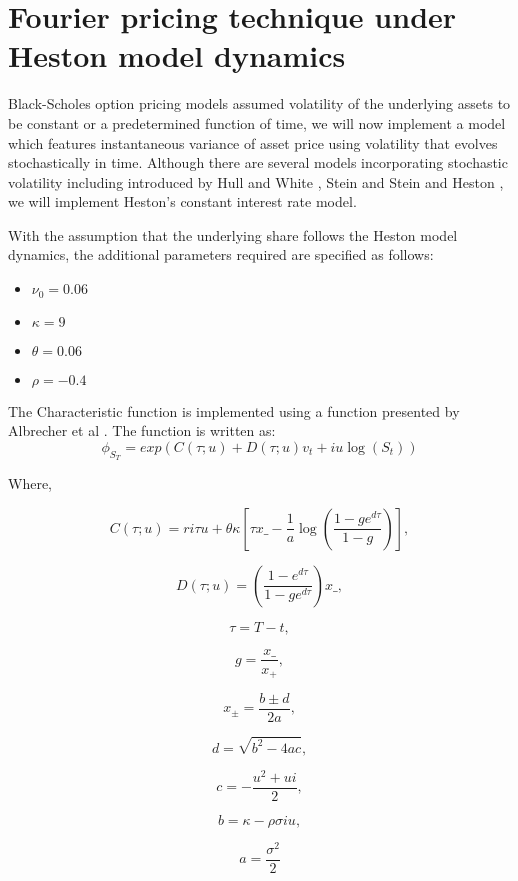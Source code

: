 \documentclass[11pt]{article}
\begin{document}
\section{Fourier pricing technique under Heston model dynamics
}

Black-Scholes option pricing models assumed volatility of the underlying assets to be constant or a predetermined function of time, we will now implement a model which features instantaneous variance of asset price using volatility that evolves stochastically in time. Although there are several models incorporating stochastic volatility including introduced by Hull and White \cite{HW1}, Stein and Stein \cite{SS1} and Heston \cite{Heston1} \cite{Heston2}, we will implement Heston's constant interest rate model.

With the assumption that the underlying share follows the Heston model dynamics, the additional parameters required are specified as follows:
\begin{itemize}
    \item $\nu_0 = 0.06$
    \item $\kappa = 9$
    \item $\theta = 0.06$
    \item $\rho = -0.4$
\end{itemize}

    The Characteristic function is implemented using a function presented by
Albrecher et al \cite{AMST1}. The function is written as:
\[\phi_{S_T} = exp(C(\tau;u)+D(\tau;u)v_t + iu \log(S_t) )\]

Where,

\[C(\tau;u) = ri\tau u + \theta \kappa [\tau x\_ - \frac{1}{a}\log(\frac{1-ge^{d\tau}}{1-g})],\]

\[D(\tau;u) = (\frac{1-e^{d\tau}}{1-ge^{d\tau}})x\_,\]

\[\tau = T -t ,\]

\[ g = \frac{x\_}{x_+},\]

\[ x_\pm = \frac{b\pm d}{2a},\]

\[ d = \sqrt{b^2 - 4ac},\]

\[ c = - \frac{u^2 + ui}{2},\]

\[ b = \kappa - \rho \sigma iu,\]

\[ a = \frac {\sigma^2}{2}\]
\end{document}
